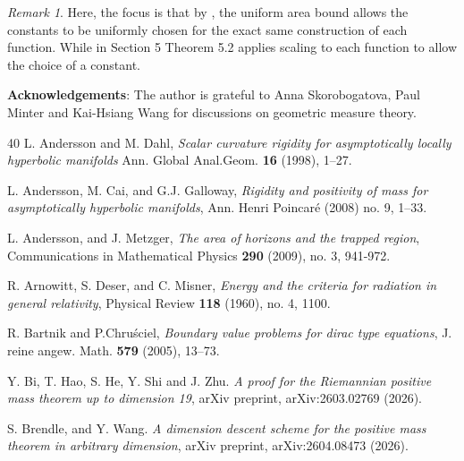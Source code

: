 \documentclass[11pt]{amsart}
\theoremstyle{remark}
\newtheorem{rem}{Remark}[section]
\numberwithin{equation}{section}
\begin{document}
{{\begin{rem}
Here, the focus is that by \cite{NV}, the uniform area bound allows the constants to be uniformly chosen for the exact same construction of each function.  While in \cite{HKLZ} Section 5 Theorem 5.2 applies scaling to each function to allow the choice of a constant. 
\end{rem}

\textbf{Acknowledgements}: The author is grateful to Anna Skorobogatova, Paul Minter and Kai-Hsiang Wang for discussions on geometric measure theory.  

\begin{thebibliography}{40} 
L. Andersson and M. Dahl, {\em Scalar curvature rigidity for asymptotically locally hyperbolic manifolds} Ann. Global Anal.Geom. \textbf{16} (1998), 1–27. 


 L. Andersson, M. Cai, and G.J. Galloway, {\em Rigidity and positivity of mass
for asymptotically hyperbolic manifolds}, Ann. Henri Poincaré (2008) no. 9, 1–33. 

L. Andersson, and J. Metzger, {\em The area of horizons and the trapped region}, Communications in Mathematical Physics \textbf{290} (2009), no. 3, 941-972.


R. Arnowitt, S. Deser, and C. Misner, {\em Energy and the criteria for radiation in general relativity}, Physical Review \textbf{118} (1960), no. 4, 1100.

R. Bartnik and P.Chruściel, {\em Boundary value problems for dirac type
equations}, J. reine angew. Math. \textbf{579} (2005), 13–73. 

 Y. Bi, T. Hao, S. He, Y. Shi and J. Zhu. {\em A proof for the Riemannian positive mass theorem up to dimension 19}, arXiv preprint, arXiv:2603.02769 (2026). 

 S. Brendle,  and Y. Wang.  {\em A dimension descent scheme for the positive mass theorem in arbitrary dimension}, arXiv preprint, arXiv:2604.08473 (2026). 


\end{thebibliography}}}
\end{document}
